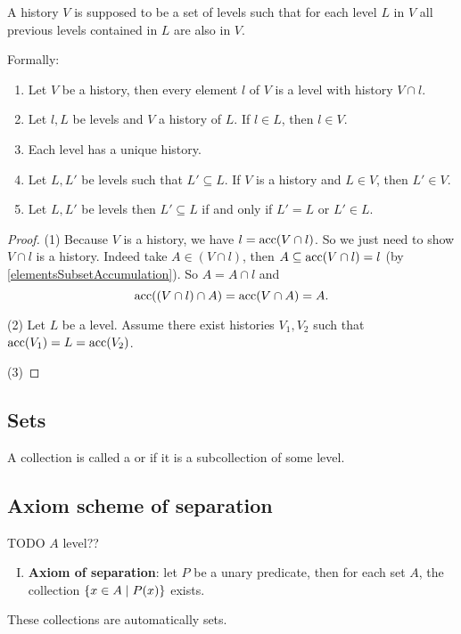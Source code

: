 A history $V$ is supposed to be a set of levels such that for each level $L$ in $V$ all previous levels contained in $L$ are also in $V$.

Formally:
\begin{proposition}
\begin{enumerate}
\item Let $V$ be a history, then every element $l$ of $V$ is a level with history $V\cap l$.

\item Let $l,L$ be levels and $V$ a history of $L$. If $l\in L$, then $l\in V$.

\item Each level has a unique history.

\item Let $L, L'$ be levels such that $L' \subseteq L$. If $V$ is a history and $L\in V$, then $L'\in V$.
\item Let $L, L'$ be levels then $L'\subseteq L$ \textup{if and only if} $L' = L$ or $L'\in L$.
\end{enumerate}
\end{proposition}
\begin{proof}
(1) Because $V$ is a history, we have $l = \operatorname{acc}(V\cap l)$. So we just need to show $V\cap l$ is a history. Indeed take $A\in (V\cap l)$, then $A \subseteq \operatorname{acc}(V\cap l) = l$ (by \ref{elementsSubsetAccumulation}). So $A = A\cap l$ and
\[ \operatorname{acc}((V\cap l)\cap A) = \operatorname{acc}(V\cap A) = A. \]

(2) Let $L$ be a level. Assume there exist histories $V_1, V_2$ such that $\operatorname{acc}(V_1) = L = \operatorname{acc}(V_2)$.

(3)
\end{proof}




\subsection{Sets}
\begin{definition}
A collection is called a  or  if it is a subcollection of some level.
\end{definition}

\subsection{Axiom scheme of separation}
TODO $A$ level??
\begin{enumerate}[(I)]
\item \textbf{Axiom of separation}: let $P$ be a unary predicate, then for each set $A$, the collection $\left\{ x\in A \;\middle|\; P(x) \right\}$ exists.
\end{enumerate}
These collections are automatically sets.

